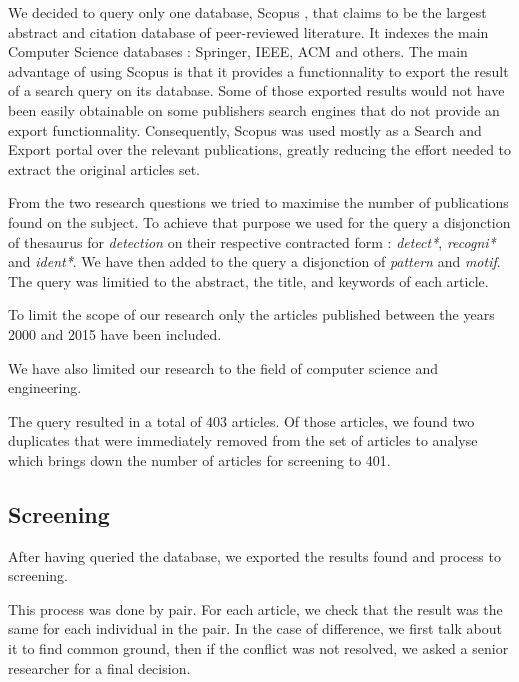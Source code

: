 \documentclass[letterpaper, 10 pt, conference]{ieeeconf}  %
\begin{document}
We decided to query only one database, Scopus \cite{c2}, that claims to be the
largest abstract and citation database of peer-reviewed literature.
It indexes the main Computer Science databases : Springer, IEEE, ACM and
others.
The main advantage of using Scopus is that it provides a functionnality to
export the result of a search query on its database.
Some of those exported results would not have been easily obtainable on some
publishers search engines that do not provide an export functionnality.
Consequently, Scopus was used mostly as a Search and Export portal over the
relevant publications, greatly reducing the effort needed to extract the
original articles set. 

From the two research questions we tried to maximise the number of publications
found on the subject.
To achieve that purpose we used for the query a disjonction of thesaurus for
\textit{detection} on their respective contracted form : \textit{detect*},
\textit{recogni*} and \textit{ident*}.
We have then added to the query a disjonction of \textit{pattern} and \textit{motif}.
The query was limitied to the abstract, the title, and keywords of each article.

To limit the scope of our research only the articles published between the years
2000 and 2015 have been included. 

We have also limited our research to the field of computer science and
engineering.

The query resulted in a total of 403 articles.
Of those articles, we found two duplicates that were immediately removed from
the set of articles to analyse which brings down the number of articles for
screening to 401.

\subsection{Screening}

After having queried the database, we exported the results found and process to
screening. 

This process was done by pair.
For each article, we check that the result was the same for each individual in
the pair.
In the case of difference, we first talk about it to find common ground, then
if the conflict was not resolved, we asked a senior researcher for a final
decision.
\end{document}
